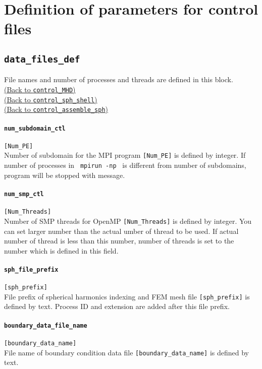 \section{Definition of parameters for control files}
\label{section:def_control}

\subsection{\tt data\_files\_def}
\label{href_t:data_files_def}
File names and number of processes and threads are defined in this block. \\
\hyperref[href_i:MHD_control]{(Back to {\tt control\_MHD})} \\
\hyperref[href_i:spherical_shell_ctl]{(Back to {\tt control\_sph\_shell})} \\
\hyperref[href_i:assemble_control]{(Back to {\tt control\_assemble\_sph})}

\paragraph{\tt num\_subdomain\_ctl}
\label{href_t:num_subdomain_ctl}
\verb|[Num_PE]| \\
Number of subdomain for the MPI program \verb|[Num_PE]| is defined by integer. If number of processes in \verb| mpirun -np | is different from number of subdomains, program will be stopped with message.

\paragraph{\tt num\_smp\_ctl}
\label{href_t:num_smp_ctl}
\verb|[Num_Threads]| \\
Number of SMP threads for OpenMP \verb|[Num_Threads]| is defined by integer. You can set larger number than the actual umber of thread to be used. If actual number of thread is less than this number, number of threads is set to the number which is defined in this field.

\paragraph{\tt sph\_file\_prefix}
\label{href_t:sph_file_prefix}
\verb|[sph_prefix]| \\
File prefix of spherical harmonics indexing and FEM mesh file \verb|[sph_prefix]| is defined by text. Process ID and extension are added after this file prefix.

\paragraph{\tt boundary\_data\_file\_name}
\label{href_t:boundary_data_file_name}
\verb|[boundary_data_name]| \\
File name of boundary condition data file \verb|[boundary_data_name]| is defined by text. 

